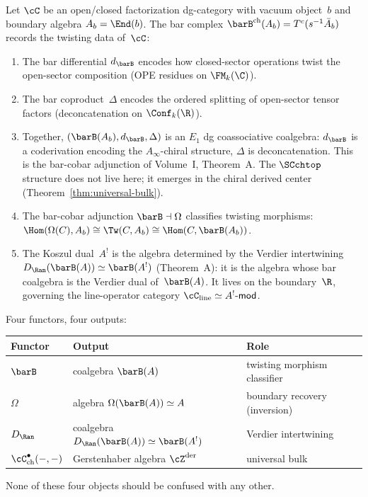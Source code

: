 \begin{proposition}
\label{prop:bar-from-open}
Let $\cC$ be an open/closed factorization dg-category with vacuum
object~$b$ and boundary algebra $A_b = \End(b)$. The bar complex
$\barB^{\mathrm{ch}}(A_b) = T^c(s^{-1}\bar{A}_b)$ records the
twisting data of~$\cC$:
\begin{enumerate}[label=\textup{(\roman*)}]
\item The bar differential $d_{\barB}$ encodes how closed-sector
 operations twist the open-sector composition (OPE residues
 on $\FM_k(\C)$).

\item The bar coproduct~$\Delta$ encodes the ordered splitting
 of open-sector tensor factors (deconcatenation on
 $\Conf_k(\R)$).

\item Together, $(\barB(A_b), d_{\barB}, \Delta)$ is an $E_1$ dg
 coassociative coalgebra: $d_{\barB}$ is a coderivation encoding
 the $A_\infty$-chiral structure, $\Delta$ is deconcatenation.
 This is the bar-cobar adjunction of Volume~I, Theorem~A.
 The $\SCchtop$ structure does not live here; it emerges in
 the chiral derived center (Theorem~\ref{thm:universal-bulk}).

\item The bar-cobar adjunction $\barB \dashv \Omega$ classifies
 twisting morphisms: $\Hom(\Omega(C), A_b) \cong
 \Tw(C, A_b) \cong \Hom(C, \barB(A_b))$.

\item The Koszul dual~$A^!$ is the algebra determined by the Verdier
 intertwining $D_{\Ran}(\barB(A)) \simeq \barB(A^!)$ (Theorem~A):
 it is the algebra whose bar coalgebra is the Verdier dual of~$\barB(A)$.
 It lives on the boundary~$\R$, governing the line-operator category
 $\cC_{\mathrm{line}} \simeq A^!\text{-}\mathsf{mod}$.
\end{enumerate}
Four functors, four outputs:
\begin{center}
\renewcommand{\arraystretch}{1.2}
\begin{tabular}{lll}
\textbf{Functor} & \textbf{Output} & \textbf{Role} \\
\hline
$\barB$ & coalgebra $\barB(A)$ & twisting morphism classifier \\
$\Omega$ & algebra $\Omega(\barB(A)) \simeq A$ & boundary recovery (inversion) \\
$D_{\Ran}$ & coalgebra $D_{\Ran}(\barB(A)) \simeq \barB(A^!)$ & Verdier intertwining \\
$\cC^\bullet_{\mathrm{ch}}(-,-)$
 & Gerstenhaber algebra $\cZ^{\mathrm{der}}$
 & universal bulk \\
\end{tabular}
\end{center}
None of these four objects should be confused with any other.
\end{proposition}

